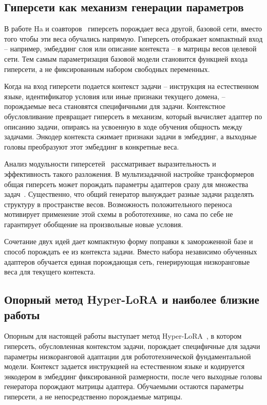 \documentclass{misisarticle}
\begin{document}
\subsection{Гиперсети как механизм генерации параметров}

В работе Ha и соавторов~\cite{hypernet} гиперсеть порождает веса другой, базовой сети, вместо того чтобы эти веса обучались напрямую. Гиперсеть отображает компактный вход -- например, эмбеддинг слоя или описание контекста -- в матрицы весов целевой сети. Тем самым параметризация базовой модели становится функцией входа гиперсети, а не фиксированным набором свободных переменных.

Когда на вход гиперсети подается контекст задачи -- инструкция на естественном языке, идентификатор условия или иные признаки текущего домена, -- порождаемые веса становятся специфичными для задачи. Контекстное обусловливание превращает гиперсеть в механизм, который вычисляет адаптер по описанию задачи, опираясь на усвоенную в ходе обучения общность между задачами. Энкодер контекста сжимает признаки задачи в эмбеддинг, а выходные головы преобразуют этот эмбеддинг в конкретные веса.

Анализ модульности гиперсетей~\cite{modularity} рассматривает выразительность и эффективность такого разложения. В мультизадачной настройке трансформеров общая гиперсеть может порождать параметры адаптеров сразу для множества задач~\cite{hyperformer}. Существенно, что общий генератор вынуждает разные задачи разделять структуру в пространстве весов. Возможность положительного переноса мотивирует применение этой схемы в робототехнике, но сама по себе не гарантирует обобщение на произвольные новые условия.

Сочетание двух идей дает компактную форму поправки к замороженной базе и способ порождать ее из контекста задачи. Вместо набора независимо обученных адаптеров обучается единая порождающая сеть, генерирующая низкоранговые веса для текущего контекста.

\subsection{Опорный метод Hyper-LoRA и наиболее близкие работы}

Опорным для настоящей работы выступает метод Hyper-LoRA~\cite{hyperlora}, в котором гиперсеть, обусловленная контекстом задачи, порождает специфичные для задачи параметры низкоранговой адаптации для робототехнической фундаментальной модели. Контекст задается инструкцией на естественном языке и кодируется энкодером в эмбеддинг фиксированной размерности, после чего выходные головы генератора порождают матрицы адаптера. Обучаемыми остаются параметры гиперсети, а не непосредственно порождаемые матрицы.
\end{document}
